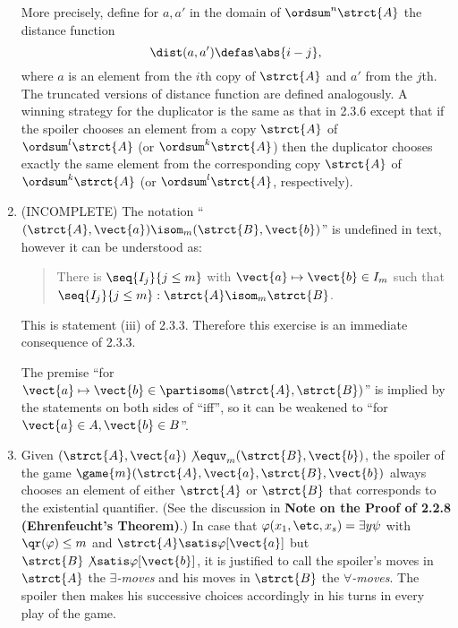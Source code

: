 \begin{enumerate}[1.]
More precisely, define for $a, a'$ in the domain of $\ordsum^n \strct{A}$ the distance function
\[
\dist(a, a') \defas \abs{i - j},
\]
where $a$ is an element from the $i$th copy of $\strct{A}$ and $a'$ from the $j$th. The truncated versions of distance function are defined analogously. A winning strategy for the duplicator is the same as that in 2.3.6 except that if the spoiler chooses an element from a copy $\strct{A}$ of $\ordsum^l \strct{A}$ (or $\ordsum^k \strct{A}$) then the duplicator chooses exactly the same element from the corresponding copy $\strct{A}$ of $\ordsum^k \strct{A}$ (or $\ordsum^l \strct{A}$, respectively).
%
\item {} (INCOMPLETE)
The notation ``$(\strct{A}, \vect{a}) \isom_m (\strct{B}, \vect{b})$'' is undefined in text, however it can be understood as:
\begin{quote}
There is $\seq{I_j}{j \leq m}$ with $\vect{a} \mapsto \vect{b} \in I_m$ such that $\seq{I_j}{j \leq m} : \strct{A} \isom_m \strct{B}$.
\end{quote}
This is statement (iii) of 2.3.3. Therefore this exercise is an immediate consequence of 2.3.3.
\begin{remark}
The premise ``for $\vect{a} \mapsto \vect{b} \in \partisoms(\strct{A}, \strct{B})$'' is implied by the statements on both sides of ``iff'', so it can be weakened to ``for $\vect{a} \in A, \vect{b} \in B$''.
\end{remark}
%
\item {} Given $(\strct{A}, \vect{a}) \not\equv_m (\strct{B}, \vect{b})$, the spoiler of the game $\game{m}(\strct{A}, \vect{a}, \strct{B}, \vect{b})$ always chooses an element of either $\strct{A}$ or $\strct{B}$ that corresponds to the existential quantifier. (See the discussion in \textbf{Note on the Proof of 2.2.8 (Ehrenfeucht’s Theorem)}.) In case that $\varphi(x_1, \etc, x_s) = \exists y \psi$ with $\qr(\varphi) \leq m$ and $\strct{A} \satis \varphi[\vect{a}]$ but $\strct{B} \not\satis \varphi[\vect{b}]$, it is justified to call the spoiler's moves in $\strct{A}$ the \emph{$\exists$-moves} and his moves in $\strct{B}$ the \emph{$\forall$-moves}. The spoiler then makes his successive choices accordingly in his turns in every play of the game.
%
\end{enumerate}


